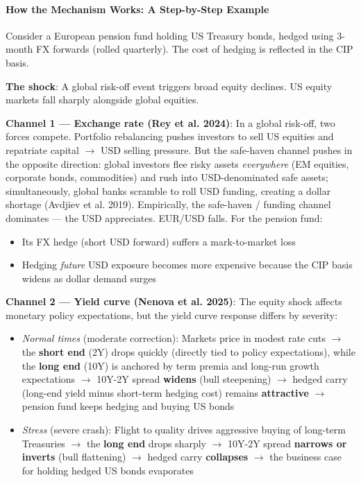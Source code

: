 \documentclass[11pt,a4paper]{article}
\begin{document}
\paragraph{How the Mechanism Works: A Step-by-Step Example}

Consider a European pension fund holding US Treasury bonds, hedged using 3-month FX forwards (rolled quarterly). The cost of hedging is reflected in the CIP basis.

\textbf{The shock}: A global risk-off event triggers broad equity declines. US equity markets fall sharply alongside global equities.

\textbf{Channel 1 --- Exchange rate (Rey et al. 2024)}: In a global risk-off, two forces compete. Portfolio rebalancing pushes investors to sell US equities and repatriate capital $\rightarrow$ USD selling pressure. But the safe-haven channel pushes in the opposite direction: global investors flee risky assets \textit{everywhere} (EM equities, corporate bonds, commodities) and rush into USD-denominated safe assets; simultaneously, global banks scramble to roll USD funding, creating a dollar shortage (Avdjiev et al. 2019). Empirically, the safe-haven / funding channel dominates --- the USD appreciates. EUR/USD falls. For the pension fund:
\begin{itemize}
\item Its FX hedge (short USD forward) suffers a mark-to-market loss
\item Hedging \textit{future} USD exposure becomes more expensive because the CIP basis widens as dollar demand surges

\end{itemize}
\textbf{Channel 2 --- Yield curve (Nenova et al. 2025)}: The equity shock affects monetary policy expectations, but the yield curve response differs by severity:
\begin{itemize}
\item \textit{Normal times} (moderate correction): Markets price in modest rate cuts $\rightarrow$ the \textbf{short end} (2Y) drops quickly (directly tied to policy expectations), while the \textbf{long end} (10Y) is anchored by term premia and long-run growth expectations $\rightarrow$ 10Y-2Y spread \textbf{widens} (bull steepening) $\rightarrow$ hedged carry (long-end yield minus short-term hedging cost) remains \textbf{attractive} $\rightarrow$ pension fund keeps hedging and buying US bonds
\item \textit{Stress} (severe crash): Flight to quality drives aggressive buying of long-term Treasuries $\rightarrow$ the \textbf{long end} drops sharply $\rightarrow$ 10Y-2Y spread \textbf{narrows or inverts} (bull flattening) $\rightarrow$ hedged carry \textbf{collapses} $\rightarrow$ the business case for holding hedged US bonds evaporates

\end{itemize}
\end{document}
